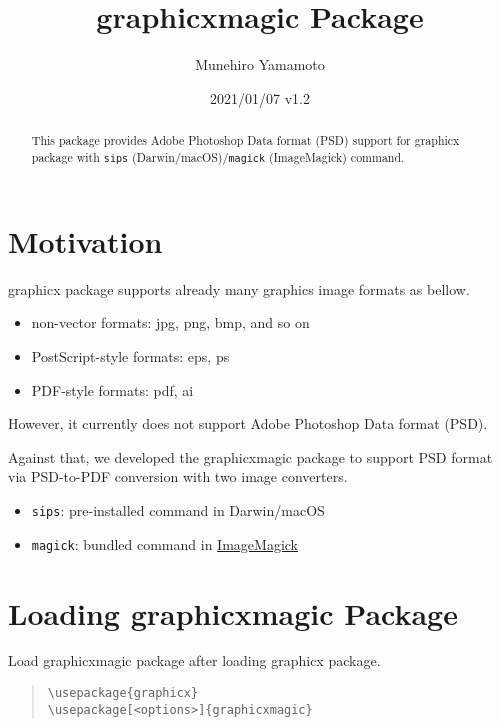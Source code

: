 \documentclass[luatex]{article}
\title{\textsf{graphicxmagic} Package}
\author{Munehiro Yamamoto} %
\date{2021/01/07 v1.2} %
\begin{document}
\maketitle
\begin{abstract} %
This package provides Adobe Photoshop Data format (PSD) support
for \textsf{graphicx} package
with \texttt{sips} (Darwin/macOS)/\texttt{magick} (ImageMagick) command.
\end{abstract}

\section{Motivation} %
\textsf{graphicx} package supports already many graphics image formats as bellow.
\begin{itemize}
\item non-vector formats: jpg, png, bmp, and so on
\item PostScript-style formats: eps, ps
\item PDF-style formats: pdf, ai
\end{itemize}
However, it currently does not support Adobe Photoshop Data format (PSD).

Against that, we developed the \textsf{graphicxmagic} package
to support PSD format via PSD-to-PDF conversion
with two image converters.
\begin{itemize}
\item \texttt{sips}:
pre-installed command in Darwin/macOS

\item \texttt{magick}:
bundled command in \href{https://www.imagemagick.org/}{ImageMagick}
\end{itemize}

\section{Loading \textsf{graphicxmagic} Package}

Load \textsf{graphicxmagic} package after loading \textsf{graphicx} package.

\begin{quote}
\begin{verbatim}
\usepackage{graphicx}
\usepackage[<options>]{graphicxmagic}
\end{verbatim}
\end{quote}
\end{document}
